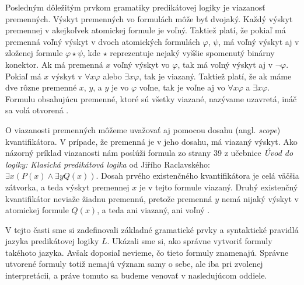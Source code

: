 \documentclass[12pt, letterpaper]{article}
\begin{document}
Posledným dôležitým prvkom gramatiky predikátovej logiky je viazanosť premenných. Výskyt premenných vo formulách môže byť dvojaký. Každý výskyt premennej v akejkoľvek atomickej formule je voľný. Taktiež platí, že pokiaľ má premenná voľný výskyt v dvoch atomických formulách $\varphi$, $\psi$, má voľný výskyt aj v zloženej formule $\varphi\star\psi$, kde $\star$ reprezentuje nejaký vyššie spomenutý binárny konektor. Ak má premenná $x$ voľný výskyt vo $\varphi$, tak má voľný výskyt aj v $\neg\varphi$. Pokiaľ má $x$ výskyt v $\forall x\varphi$ alebo $\exists x\varphi$, tak je viazaný. Taktiež platí, že ak máme dve rôzne premenné $x$, $y$, a $y$ je vo $\varphi$ voľne, tak je voľne aj vo $\forall x\varphi$ a $\exists x\varphi$. Formulu obsahujúcu premenné, ktoré sú všetky viazané, nazývame uzavretá, ináč sa volá otvorená \parencites[301]{peregrin_filosofie_2017}[139]{svejdar_logika_2002}.\par 
O viazanosti premenných môžeme uvažovať aj pomocou dosahu (angl. \textit{scope}) kvantifikátora. V prípade, že premenná je v jeho dosahu, má viazaný výskyt. Ako názorný príklad viazanosti nám poslúži formula zo strany 39 z učebnice \textit{Úvod do logiky: Klasická predikátová logika} od Jiřího Raclavského: $\exists x ( P(x) \land \exists y Q(x))$. Dosah prvého existenčného kvantifikátora je celá väčšia zátvorka, a teda výskyt premennej $x$ je v tejto formule viazaný. Druhý existenčný kvantifikátor neviaže žiadnu premennú, pretože premenná $y$ nemá nijaký výskyt v atomickej formule $Q(x)$, a teda ani viazaný, ani voľný \parencite[39]{raclavsky_uvod_2015}.\par
V tejto časti sme si zadefinovali základné gramatické prvky a syntaktické pravidlá jazyka predikátovej logiky $L$. Ukázali sme si, ako správne vytvoriť formuly takéhoto jazyka. Avšak doposiaľ nevieme, čo tieto formuly znamenajú. Správne utvorené formuly totiž nemajú význam samy o sebe, ale iba pri zvolenej interpretácii, a práve tomuto sa budeme venovať v nasledujúcom oddiele.
\end{document}
